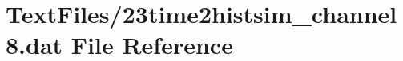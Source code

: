\hypertarget{23time2histsim__channel8_8dat}{}\section{Text\+Files/23time2histsim\+\_\+channel8.dat File Reference}
\label{23time2histsim__channel8_8dat}

